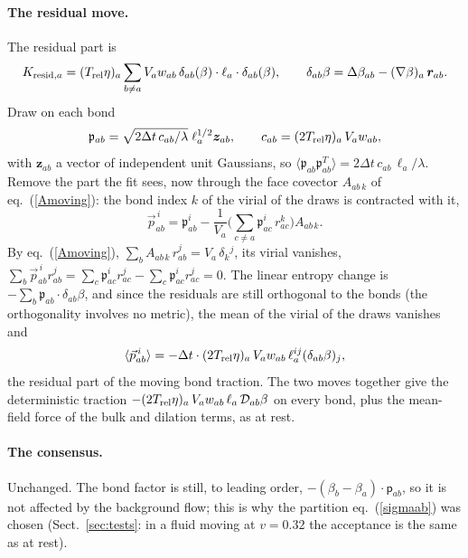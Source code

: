 \documentclass[11pt,aps,preprint,nofootinbib,superscriptaddress,tightenlines]{revtex4-2}
\def\st{\begin{equation}}
\def\stp{\end{equation}}
\def\Eq#1{eq.~(\ref{#1})}
\def\Sect#1{Sect.~\ref{#1}}
\newcommand{\pf}{\bm{\mathsf p}}
\newcommand{\avg}[1]{\langle #1\rangle}
\let\oldparagraph\paragraph
\renewcommand{\paragraph}{\par\bigskip\oldparagraph}
\begin{document}
\paragraph{The residual move.}  The residual part is
\st
K_{{\rm resid},a}=(T_{\rm rel}\eta)_a\sum_{b\neq a}V_aw_{ab}\,\delta_{ab}(\beta)\cdot\ell_a\cdot\delta_{ab}(\beta),
\qquad \delta_{ab}\beta=\Delta\beta_{ab}-(\nabla\beta)_a\,\bm r_{ab} .
\stp
Draw on each bond
\st
\mathfrak p_{ab}=\sqrt{2\Delta t\,c_{ab}/\lambda}\;\ell_a^{1/2}\bm z_{ab},\qquad
c_{ab}=(2T_{\rm rel}\eta)_a\,V_aw_{ab},
\stp
with $\bm z_{ab}$ a vector of independent unit Gaussians, so
$\avg{\mathfrak p_{ab}\mathfrak p_{ab}^T}=2\Delta t\,c_{ab}\,\ell_a/\lambda$.  Remove the part
the fit sees, now through the face covector $A_{ab\,k}$ of \Eq{Amoving}: the
bond index $k$ of the virial of the draws is contracted with it,
\st
\vec p^{\,i}_{ab}=\mathfrak p^i_{ab}-\frac1{V_a}\Big(\sum_{c\neq a}\mathfrak p^i_{ac}\,r^k_{ac}\Big)A_{ab\,k} .
\stp
By \Eq{Amoving}, $\sum_bA_{ab\,k}\,r^j_{ab}=V_a\,\delta_k{}^j$, its virial vanishes,
$\sum_b\vec p^{\,i}_{ab}r^j_{ab}=\sum_c\mathfrak p^i_{ac}r^j_{ac}-\sum_c\mathfrak p^i_{ac}r^j_{ac}=0$.
The linear entropy change is $-\sum_b\mathfrak p_{ab}\cdot\delta_{ab}\beta$, and since the
residuals are still orthogonal to the bonds (the orthogonality involves no
metric), the mean of the virial of the draws vanishes and
\st
\avg{\vec p^{\,i}_{ab}}=-\Delta t\cdot(2T_{\rm rel}\eta)_a\,V_aw_{ab}\,\ell_a^{ij}(\delta_{ab}\beta)_j ,
\stp
the residual part of the moving bond traction.  The two moves together give
the deterministic traction $-(2T_{\rm rel}\eta)_a\,V_aw_{ab}\,\ell_a\,\mathcal D_{ab}\beta$ on
every bond, plus the mean-field force of the bulk and dilation terms, as at rest.

\paragraph{The consensus.}  Unchanged.  The bond factor is still, to leading
order, $-(\beta_b-\beta_a)\cdot\pf_{ab}$, so it is not affected by the
background flow; this is why the partition \Eq{sigmaab} was chosen
(\Sect{sec:tests}: in a fluid moving at $v=0.32$ the acceptance is the same as
at rest).
\end{document}

